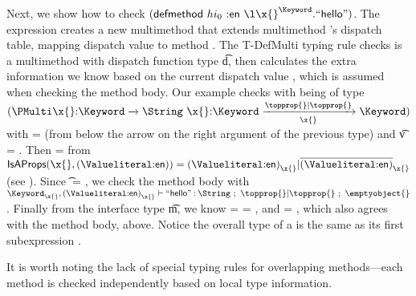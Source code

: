 Next, we show how to check
$
{\extendmultiexp {hi_0} {\makekw{en}} {\abs {\x{}} {\Keyword} {\makestr{hello}}}}
$.
%
The expression 
{ {} {}} creates a new multimethod
that extends multimethod 's dispatch table, mapping dispatch value
 to method . The T-DefMulti typing rule
checks  is a multimethod with dispatch function type \t{d},
then calculates the extra information we know based on the current
dispatch value {\thenprop{\proppp{}}}, which is assumed when checking the method
body.
Our example checks with  being of type
$
{\MultiFntype {\ArrowTwo{\x{}}{\Keyword}{\String}}
              {\ArrowOne{\x{}}{\Keyword}{\Keyword}{\filterset{\topprop{}}{\topprop{}}}{\x{}}}}
$
with \objectp{} = {\x{}} (from below the arrow on the right argument of the previous type) and \t{v} = . 
Then {\thenprop{\proppp{}}} = 
{}
from
$
\isacompare{}{\x{}}{\Value{\makekw{en}}}
{\filterset {\isprop {\Value{\makekw{en}}}{\x{}}}{\notprop{\Value{\makekw{en}}}{\x{}}}}
$
(see ).
Since \t{} = \Keyword{}, we check the method body with
$
\judgement{{\isprop{\Keyword}{\x{}}},{\isprop {\Value{\makekw{en}}}{\x{}}}}
  {\makestr{hello}}
  {\String}{\filterset{\topprop{}}{\topprop{}}}{\emptyobject{}}
$.
Finally from the interface type \t{m}, we know \thenprop{\prop{}} = \elseprop{\prop{}} = \topprop{},
and \object{} = \emptyobject{}, which also agrees with the method body, above.
Notice the overall type of a  is the same as its first subexpression .

It is worth noting the lack of special typing rules for overlapping methods---each
method is checked independently based on local type information.

